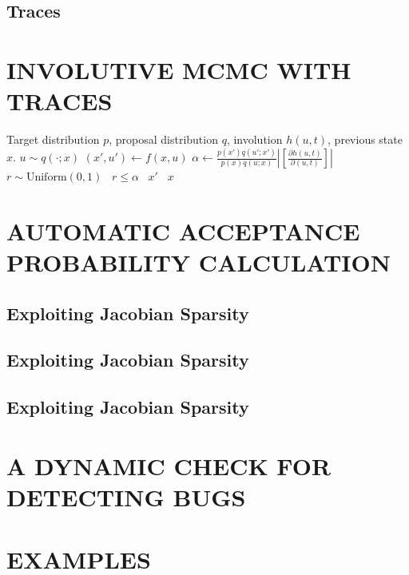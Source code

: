 \documentclass[twoside]{article}
\begin{document}
\subsection{Traces}

\section{INVOLUTIVE MCMC WITH TRACES}

\begin{algorithmic}
\Require Target distribution $p$, proposal distribution $q$, involution $h(u, t)$, previous state $x$.
    \State $u \sim q(\cdot; x)$ 
    \State $(x', u') \gets f(x, u)$ 
    \State $\alpha \gets
        \frac{p(x') q(u'; x')}{p(x) q(u; x)} \left| \left[ \frac{\partial h(u, t)}{\partial (u, t)} \right] \right|$
    \State $r \sim \mathrm{Uniform}(0, 1)$
    \State \algorithmicif \, $r \le \alpha$ \algorithmicthen \, \Return $x'$ \algorithmicelse \, \Return $x$ 
\EndProcedure
\end{algorithmic}


\section{AUTOMATIC ACCEPTANCE PROBABILITY CALCULATION}

\subsection{Exploiting Jacobian Sparsity}

\subsection{Exploiting Jacobian Sparsity}

\subsection{Exploiting Jacobian Sparsity}

\section{A DYNAMIC CHECK FOR DETECTING BUGS}

\section{EXAMPLES}
\end{document}
